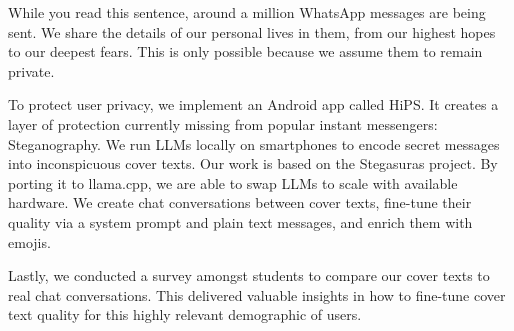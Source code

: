 
\begingroup
\let\clearpage\relax
\let\cleardoublepage\relax
\let\cleardoublepage\relax

While you read this sentence, around a million WhatsApp messages are being sent. We share the details of our personal lives in them, from our highest hopes to our deepest fears. This is only possible because we assume them to remain private.

To protect user privacy, we implement an Android app called \gls{HiPS}. It creates a layer of protection currently missing from popular instant messengers: Steganography. We run \glspl{LLM} locally on smartphones to encode secret messages into inconspicuous cover texts. Our work is based on the Stegasuras project. By porting it to llama.cpp, we are able to swap \glspl{LLM} to scale with available hardware. We create chat conversations between cover texts, fine-tune their quality via a system prompt and plain text messages, and enrich them with emojis.

Lastly, we conducted a survey amongst students to compare our cover texts to real chat conversations. This delivered valuable insights in how to fine-tune cover text quality for this highly relevant demographic of users.

\vfill

\begin{otherlanguage}{ngerman}
\end{otherlanguage}

\endgroup

\vfill
